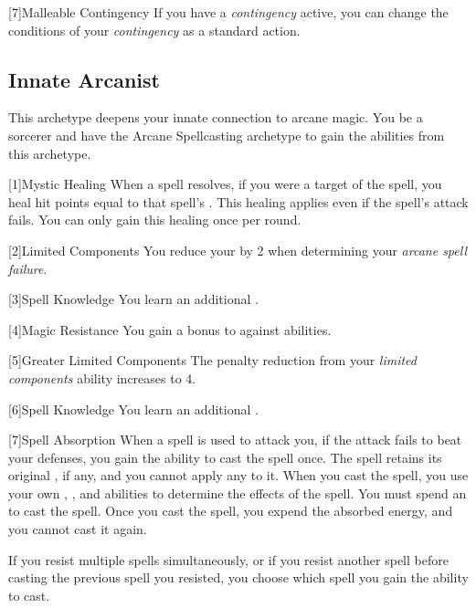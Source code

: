        [7]{Malleable Contingency} If you have a \textit{contingency} active, you can change the conditions of your \textit{contingency} as a standard action.

    \subsection{Innate Arcanist}
        This archetype deepens your innate connection to arcane magic.
        You be a sorcerer and have the Arcane Spellcasting archetype to gain the abilities from this archetype.

        [1]{Mystic Healing}
        When a spell resolves, if you were a target of the spell, you heal hit points equal to that spell's .
        This healing applies even if the spell's attack fails.
        You can only gain this healing once per round.

        [2]{Limited Components} You reduce your  by 2 when determining your \textit{arcane spell failure}.

        [3]{Spell Knowledge} You learn an additional .

        [4]{Magic Resistance} You gain a  bonus to  against  abilities.

        [5]{Greater Limited Components} The penalty reduction from your \textit{limited components} ability increases to 4.

        [6]{Spell Knowledge} You learn an additional .

        [7]{Spell Absorption} When a spell is used to attack you, if the attack fails to beat your defenses, you gain the ability to cast the spell once.
        The spell retains its original , if any, and you cannot apply any  to it.
        When you cast the spell, you use your own , , and abilities to determine the effects of the spell.
        You must spend an  to cast the spell.
        Once you cast the spell, you expend the absorbed energy, and you cannot cast it again.

        If you resist multiple spells simultaneously, or if you resist another spell before casting the previous spell you resisted, you choose which spell you gain the ability to cast.

\newpage
